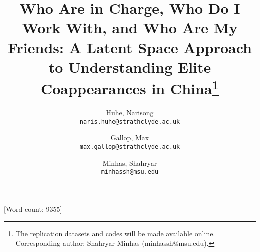 \documentclass[11pt,english]{article}
\date{}
\begin{document}
\begin{spacing}{1}

\author{
  Huhe, Narisong\\
  \texttt{naris.huhe@strathclyde.ac.uk}
  \and
  Gallop, Max\\
  \texttt{max.gallop@strathclyde.ac.uk}
  \and
  Minhas, Shahryar\\
  \texttt{minhassh@msu.edu}
}

\title{\textbf{Who Are in Charge, Who Do I Work With, and Who Are My Friends:
A Latent Space Approach to Understanding Elite Coappearances in China}\thanks{The replication datasets and codes will be made available online. Corresponding author: Shahryar Minhas (minhassh@msu.edu).
}}


\maketitle


\end{spacing}
[Word count: 9355]
\end{document}
